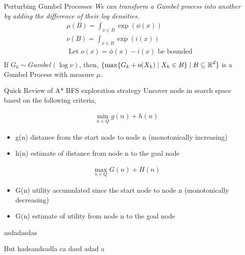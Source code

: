 \begin{frame}{Perturbing Gumbel Processes} %
  \emph{We can transform a Gumbel process into another by adding the difference of their log densities.} \\
  \begin{align*}
    & \mu(B) = \int_{x\in B} \exp(\phi(x)) \\
    & \nu(B)=\int_{x\in B} \exp(i(x)) \tag{easy}\\
    & \text{ Let $o(x) = \phi(x) - i(x)$ be bounded} \\
  \end{align*}
  If $G_k \sim Gumbel(\log\nu)$, then, $\{\max\{G_k + o(X_k) \mid X_k \in B\} \mid B \subseteq \operatorname{\mathbb{R}}^d\}$ is a Gumbel Process with measure $\mu$.
\end{frame}


\begin{frame}{Quick Review of A*}
  BFS exploration strategy
  Uncover node in search space based on the following criteria,
  \begin{overprint}
    \begin{align*}
      \min_{n \in Q} g(n) + h(n)
    \end{align*}

    \begin{itemize}
    \item g(n) distance from the start node to node n (monotonically increasing)
    \item h(n) estimate of distance from node n to the goal node
    \end{itemize}
    \begin{align*}
      \max_{n \in Q} G(n) + H(n)
    \end{align*}

    \begin{itemize}
    \item G(n) utility accumulated since the start node to node n (monotonically decreasing)
    \item G(n) estimate of utility from node n to the goal node
    \end{itemize}
    
  \end{overprint}
\end{frame}
\begin{frame}
   {asdadasdas}

      {
        But
        hadsandsadla ca
        dasd
        adad
        a}
\end{frame}


